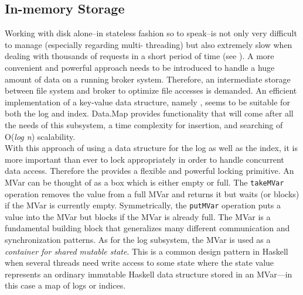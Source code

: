 



\subsection{In-memory Storage}
\label{subsec:broker-log-inmemory}

Working with disk alone--in stateless fashion so to
speak--is not only very difficult to manage (especially regarding multi-
threading) but also extremely slow when
dealing with thousands of requests in a short period of time (see
). A more convenient and powerful
approach needs to be introduced to handle a huge amount of data on a running broker
system. Therefore, an intermediate storage between file system and broker to
optimize file accesses is demanded. An efficient implementation of a key-value
data structure, namely
,
seems to be suitable for both the log and index. Data.Map
provides functionality that will come after all the needs of this subsystem,
a time complexity for insertion, and searching of O(\textit{log n})
scalability. \\

With this approach of using a data structure for the log as well as the index,
it is more important than ever to lock appropriately in order to handle
concurrent data access. Therefore the
provides a flexible and powerful locking primitive. An MVar can be thought of as
a box which is either empty or full.  The \lstinline{takeMVar} operation removes
the value from a full MVar and returns it but waits (or blocks) if the MVar is
currently empty.  Symmetrically, the \lstinline{putMVar} operation puts a value
into the MVar but blocks if the MVar is already full.  The MVar is a fundamental
building block that generalizes many different communication and synchronization
patterns. As for the log subsystem, the MVar is used as a \textit{container for
shared mutable state}. This is a common design pattern in Haskell when several
threads need write access to some state where the state value
represents an ordinary immutable Haskell data structure stored in an MVar---in
this case a map of logs or indices. \cite{marlow2013parallel}

